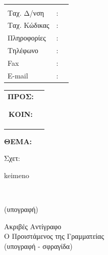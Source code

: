 \documentclass[12pt]{article}
\begin{document}
\\
\noindent
\begin{minipage}{.6\textwidth}
	\begin{tabular}{lll}
		&  &  \\ 
		Tαχ. Δ/νση & : &   \\
		Ταχ. Κώδικας & : &   \\
		Πληροφορίες & : &   \\
		Τηλέφωνο & : &   \\
		Fax & : &   \\
		E-mail & : &   \\
	\end{tabular} 
\end{minipage}
\begin{minipage}{.4\textwidth}
	\begin{tabular}{cc}
		\textbf{ΠΡΟΣ:} &  \\ 
		&  \\ 
		&  \\ 
		\textbf{ΚΟΙΝ:} &  \\ 
		&  \\ 
		&  \\ 
		&  \\ 
	\end{tabular} 
\end{minipage}
\vspace{2cm}
\begin{flushleft}
	\textbf{ΘΕΜΑ:}
\end{flushleft}
\begin{flushleft}
	Σχετ:
\end{flushleft}
\vspace{1cm}
\begin{minipage}{\textwidth}
	keimeno
\end{minipage}
\\
\vspace{.5cm}
\begin{flushright}
	(υπογραφή)
\end{flushright}

\begin{minipage}{.4\textwidth}
\begin{center}
	Aκριβές Αντίγραφο\\
	Ο Προιστάμενος της Γραμματείας\\
	\vspace{0.5cm}
	(υπογραφή - σφραγίδα)
\end{center}
\end{minipage}
\end{document}
